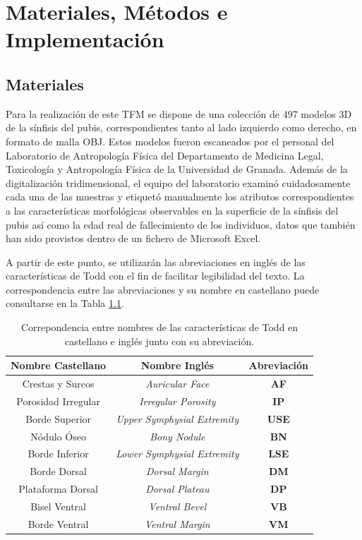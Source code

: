\chapter{Materiales, Métodos e Implementación}

\section{Materiales}
\label{section4:materials}
Para la realización de este TFM se dispone de una colección de 497 modelos 3D de la sínfisis del pubis, correspondientes tanto al lado izquierdo como derecho, en formato de malla OBJ. Estos modelos fueron escaneados por el personal del Laboratorio de Antropología Física del Departamento de Medicina Legal, Toxicología y Antropología Física de la Universidad de Granada. Además de la digitalización tridimensional, el equipo del laboratorio examinó cuidadosamente cada una de las muestras y etiquetó manualmente los atributos correspondientes a las características morfológicas observables en la superficie de la sínfisis del pubis así como la edad real de fallecimiento de los individuos, datos que también han sido provistos dentro de un fichero de Microsoft Excel.

A partir de este punto, se utilizarán las abreviaciones en inglés de las características de Todd con el fin de facilitar legibilidad del texto. La correspondencia entre las abreviaciones y su nombre en castellano puede consultarse en la Tabla \ref{table4:chars_short_names}.

\begin{table}[h]
    \centering
    \begin{tabular}{|c|c|c|}
    \hline
    \rowcolor[HTML]{D33333} 
    {\color[HTML]{FFFFFF} Nombre Castellano} & {\color[HTML]{FFFFFF} Nombre Inglés} & {\color[HTML]{FFFFFF} Abreviación} \\ \hline
    Crestas y Surcos & \textit{Auricular Face} & \textbf{AF} \\ \hline
    Porosidad Irregular & \textit{Irregular Porosity} & \textbf{IP} \\ \hline
    Borde Superior & \textit{Upper Symphysial Extremity} & \textbf{USE} \\ \hline
    Nódulo Óseo & \textit{Bony Nodule} & \textbf{BN} \\ \hline
    Borde Inferior & \textit{Lower Symphysial Extremity} & \textbf{LSE} \\ \hline
    Borde Dorsal & \textit{Dorsal Margin} & \textbf{DM} \\ \hline
    Plataforma Dorsal & \textit{Dorsal Plateau} & \textbf{DP} \\ \hline
    Bisel Ventral & \textit{Ventral Bevel} & \textbf{VB} \\ \hline
    Borde Ventral & \textit{Ventral Margin} & \textbf{VM} \\ \hline
    \end{tabular}
    \caption{Correpondencia entre nombres de las características de Todd en castellano e inglés junto con su abreviación.}
    \label{table4:chars_short_names}
\end{table}

